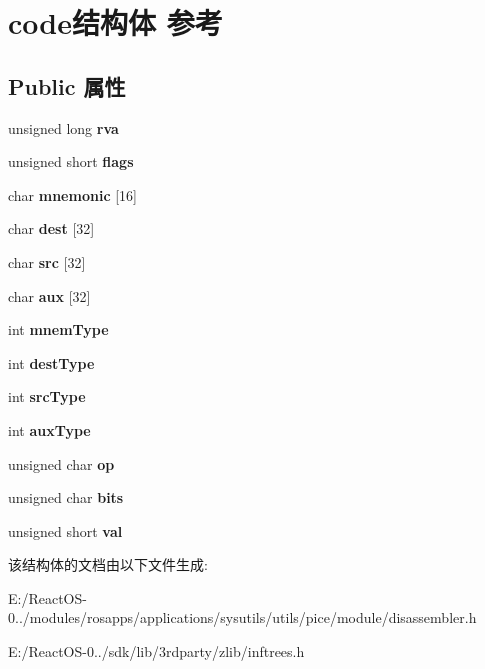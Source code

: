 \hypertarget{structcode}{}\section{code结构体 参考}
\label{structcode}
\subsection*{Public 属性}
\begin{DoxyCompactItemize}
\item 
\mbox{\label{structcode_ab5eb6531bb46c445d922b7640a376326}} 
unsigned long {\bfseries rva}
\item 
\mbox{\label{structcode_a44d6282f41c01bccc49412643d8bc2f1}} 
unsigned short {\bfseries flags}
\item 
\mbox{\label{structcode_af246806ca86c7e230710d06915e1c5d6}} 
char {\bfseries mnemonic} \mbox{[}16\mbox{]}
\item 
\mbox{\label{structcode_acb99e72d8f3301d4d7b944ae31261c6e}} 
char {\bfseries dest} \mbox{[}32\mbox{]}
\item 
\mbox{\label{structcode_ab2888c594de8fd5da274b5e45f97eb69}} 
char {\bfseries src} \mbox{[}32\mbox{]}
\item 
\mbox{\label{structcode_a9531b4718943edd4bd246d1f0c1b8739}} 
char {\bfseries aux} \mbox{[}32\mbox{]}
\item 
\mbox{\label{structcode_a19cc9732ef1abc56fdc3beb3a13c0c9a}} 
int {\bfseries mnem\+Type}
\item 
\mbox{\label{structcode_ae3e139b7180c065c70b4864dc5ecae6b}} 
int {\bfseries dest\+Type}
\item 
\mbox{\label{structcode_ab23c23c345fb50ba334a29fe36b6006f}} 
int {\bfseries src\+Type}
\item 
\mbox{\label{structcode_a497826f442c39e1fe29aa6cf05dfdf84}} 
int {\bfseries aux\+Type}
\item 
\mbox{\label{structcode_a4f075d73a9177d05cc7d332105295b83}} 
unsigned char {\bfseries op}
\item 
\mbox{\label{structcode_a5defcebb356dca1a5a8d39995f28d66b}} 
unsigned char {\bfseries bits}
\item 
\mbox{\label{structcode_a6f9c73627997e8fc6df02e620cf9a6f5}} 
unsigned short {\bfseries val}
\end{DoxyCompactItemize}


该结构体的文档由以下文件生成\+:\begin{DoxyCompactItemize}
\item 
E\+:/\+React\+O\+S-\/0../modules/rosapps/applications/sysutils/utils/pice/module/disassembler.\+h\item 
E\+:/\+React\+O\+S-\/0../sdk/lib/3rdparty/zlib/inftrees.\+h\end{DoxyCompactItemize}
